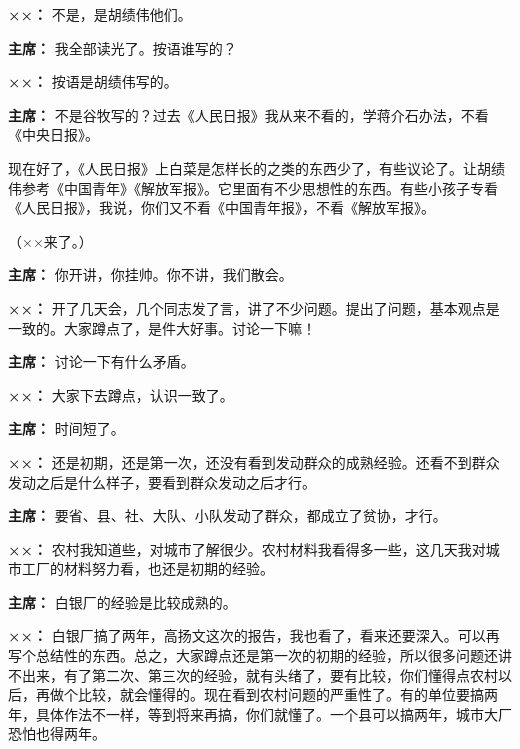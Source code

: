 \begin{list}{}
\item[\textbf{××：}] 不是，是胡绩伟他们。

\item[\textbf{主席：}] 我全部读光了。按语谁写的？

\item[\textbf{××：}] 按语是胡绩伟写的。

\item[\textbf{主席：}] 不是谷牧写的？过去《人民日报》我从来不看的，学蒋介石办法，不看《中央日报》。

现在好了，《人民日报》上白菜是怎样长的之类的东西少了，有些议论了。让胡绩伟参考《中国青年》《解放军报》。它里面有不少思想性的东西。有些小孩子专看《人民日报》，我说，你们又不看《中国青年报》，不看《解放军报》。

（××来了。）

\item[\textbf{主席：}] 你开讲，你挂帅。你不讲，我们散会。

\item[\textbf{××：}] 开了几天会，几个同志发了言，讲了不少问题。提出了问题，基本观点是一致的。大家蹲点了，是件大好事。讨论一下嘛！

\item[\textbf{主席：}] 讨论一下有什么矛盾。

\item[\textbf{××：}] 大家下去蹲点，认识一致了。

\item[\textbf{主席：}] 时间短了。

\item[\textbf{××：}] 还是初期，还是第一次，还没有看到发动群众的成熟经验。还看不到群众发动之后是什么样子，要看到群众发动之后才行。

\item[\textbf{主席：}] 要省、县、社、大队、小队发动了群众，都成立了贫协，才行。

\item[\textbf{××：}] 农村我知道些，对城市了解很少。农村材料我看得多一些，这几天我对城市工厂的材料努力看，也还是初期的经验。

\item[\textbf{主席：}] 白银厂的经验是比较成熟的。

\item[\textbf{××：}] 白银厂搞了两年，高扬文这次的报告，我也看了，看来还要深入。可以再写个总结性的东西。总之，大家蹲点还是第一次的初期的经验，所以很多问题还讲不出来，有了第二次、第三次的经验，就有头绪了，要有比较，你们懂得点农村以后，再做个比较，就会懂得的。现在看到农村问题的严重性了。有的单位要搞两年，具体作法不一样，等到将来再搞，你们就懂了。一个县可以搞两年，城市大厂恐怕也得两年。


\end{list}
